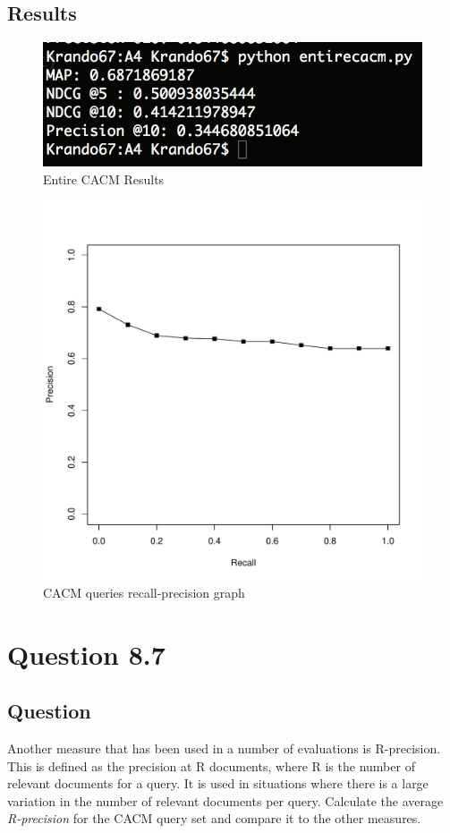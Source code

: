 \documentclass[10pt,letterpaper,bibliography=totoc]{scrartcl}
\begin{document}
\subsection{Results}
\begin{figure}[h!]
\centering
\label{fig:cacm}
\includegraphics[scale=.5]{entirecacm.png}
\caption{Entire CACM Results}
\end{figure}
\begin{figure}[h!]
\centering
\label{fig:overallavg}
\includegraphics[scale=.5]{avgall.pdf}
\caption{CACM queries recall-precision graph}
\end{figure}

\section{Question 8.7}
\subsection {Question}
Another measure that has been used in a number of evaluations is R-precision.  This is defined as the precision at R documents, where R is the number of relevant documents for a query. It is used in situations where there is a large variation in the number of relevant documents per query. Calculate the average \textit{R-precision} for the CACM query set and compare it to the other measures.
\end{document}
